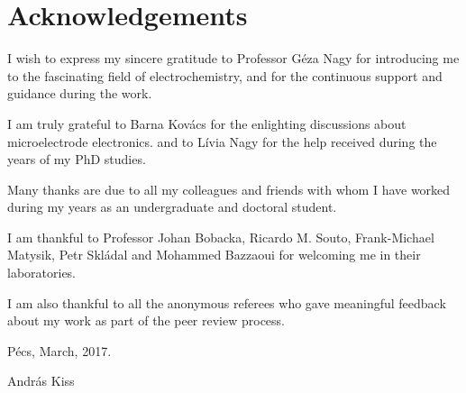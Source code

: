 \chapter*{Acknowledgements}
I wish to express my sincere gratitude to Professor Géza Nagy for introducing me to the fascinating field of electrochemistry, and for the continuous support and guidance during the work. 

\vspace{5mm}

I am truly grateful to Barna Kovács for the enlighting discussions about microelectrode electronics. and to Lívia Nagy for the help received during the years of my PhD studies.

\vspace{5mm}

Many thanks are due to all my colleagues and friends with whom I have worked during my years as an undergraduate and doctoral student.

\vspace{5mm}

I am thankful to Professor Johan Bobacka, Ricardo M. Souto, Frank-Michael Matysik, Petr Skládal and Mohammed Bazzaoui for welcoming me in their laboratories.

\vspace{5mm}

I am also thankful to all the anonymous referees who gave meaningful feedback about my work as part of the peer review process.

\vspace{20mm}

Pécs, March, 2017.

\vspace{5mm}

András Kiss
